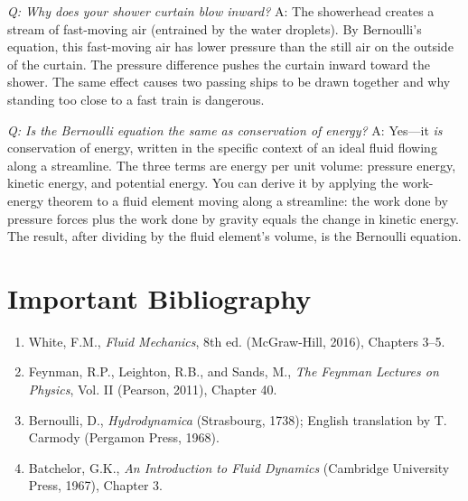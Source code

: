 \textit{Q: Why does your shower curtain blow inward?}
A: The showerhead creates a stream of fast-moving air (entrained by the water droplets). By Bernoulli's equation, this fast-moving air has lower pressure than the still air on the outside of the curtain. The pressure difference pushes the curtain inward toward the shower. The same effect causes two passing ships to be drawn together and why standing too close to a fast train is dangerous.

\textit{Q: Is the Bernoulli equation the same as conservation of energy?}
A: Yes---it \emph{is} conservation of energy, written in the specific context of an ideal fluid flowing along a streamline. The three terms are energy per unit volume: pressure energy, kinetic energy, and potential energy. You can derive it by applying the work-energy theorem to a fluid element moving along a streamline: the work done by pressure forces plus the work done by gravity equals the change in kinetic energy. The result, after dividing by the fluid element's volume, is the Bernoulli equation.
\section*{Important Bibliography}
\begin{enumerate}
\item White, F.M., \textit{Fluid Mechanics}, 8th ed. (McGraw-Hill, 2016), Chapters 3--5.
\item Feynman, R.P., Leighton, R.B., and Sands, M., \textit{The Feynman Lectures on Physics}, Vol. II (Pearson, 2011), Chapter 40.
\item Bernoulli, D., \textit{Hydrodynamica} (Strasbourg, 1738); English translation by T. Carmody (Pergamon Press, 1968).
\item Batchelor, G.K., \textit{An Introduction to Fluid Dynamics} (Cambridge University Press, 1967), Chapter 3.
\end{enumerate}


